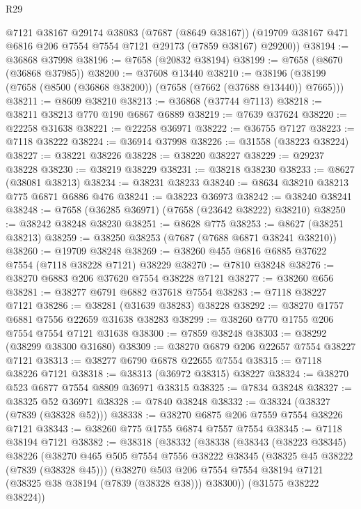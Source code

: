 \begin{lexlean}{R29}
\begin{coremodule}
      @7121
      @38167
      @29174
      @38083
      (@7687 (@8649 @38167))
      (@19709 @38167 @471 @6816 @206 @7554 @7554 @7121 @29173 (@7859 @38167) @29200))
@38194 := @36868 @37998
@38196 := @7658 (@20832 @38194)
@38199 := @7658 (@8670 (@36868 @37985))
@38200 := @37608 @13440
@38210 := @38196 (@38199 (@7658 (@8500 (@36868 @38200)) (@7658 (@7662 (@37688 @13440)) @7665)))
@38211 := @8609 @38210
@38213 := @36868 (@37744 @7113)
@38218 := @38211 @38213 @770 @190 @6867 @6889
@38219 := @7639 @37624
@38220 := @22258 @31638
@38221 := @22258 @36971
@38222 := @36755 @7127
@38223 := @7118 @38222
@38224 := @36914 @37998
@38226 := @31558 (@38223 @38224)
@38227 := @38221 @38226
@38228 := @38220 @38227
@38229 := @29237 @38228
@38230 := @38219 @38229
@38231 := @38218 @38230
@38233 := @8627 (@38081 @38213)
@38234 := @38231 @38233
@38240 := @8634 @38210 @38213 @775 @6871 @6886 @476
@38241 := @38223 @36973
@38242 := @38240 @38241
@38248 := @7658 (@36285 @36971) (@7658 (@23642 @38222) @38210)
@38250 := @38242 @38248 @38230
@38251 := @8628 @775
@38253 := @8627 (@38251 @38213)
@38259 := @38250 @38253 (@7687 (@7688 @6871 @38241 @38210))
@38260 := @19709 @38248
@38269 := @38260 @455 @6816 @6885 @37622 @7554 (@7118 @38228 @7121) @38229
@38270 := @7810 @38248
@38276 := @38270 @6883 @206 @37620 @7554 @38228 @7121
@38277 := @38260 @656
@38281 := @38277 @6791 @6882 @37618 @7554
@38283 := @7118 @38227 @7121
@38286 := @38281 (@31639 @38283) @38228
@38292 := @38270 @1757 @6881 @7556 @22659 @31638 @38283
@38299 := @38260 @770 @1755 @206 @7554 @7554 @7121 @31638
@38300 := @7859 @38248
@38303 := @38292 (@38299 @38300 @31680)
@38309 := @38270 @6879 @206 @22657 @7554 @38227 @7121
@38313 := @38277 @6790 @6878 @22655 @7554
@38315 := @7118 @38226 @7121
@38318 := @38313 (@36972 @38315) @38227
@38324 := @38270 @523 @6877 @7554 @8809 @36971 @38315
@38325 := @7834 @38248
@38327 := @38325 @52 @36971
@38328 := @7840 @38248
@38332 := @38324 (@38327 (@7839 (@38328 @52)))
@38338 := @38270 @6875 @206 @7559 @7554 @38226 @7121
@38343 := @38260 @775 @1755 @6874 @7557 @7554
@38345 := @7118 @38194 @7121
@38382 := @38318
    (@38332
      (@38338
        (@38343
          (@38223 @38345)
          @38226
          (@38270
            @465
            @505
            @7554
            @7556
            @38222
            @38345
            (@38325 @45 @38222 (@7839 (@38328 @45)))
            (@38270
              @503
              @206
              @7554
              @7554
              @38194
              @7121
              (@38325 @38 @38194 (@7839 (@38328 @38)))
              @38300))
          (@31575 @38222 @38224))

\end{coremodule}
\end{lexlean}
